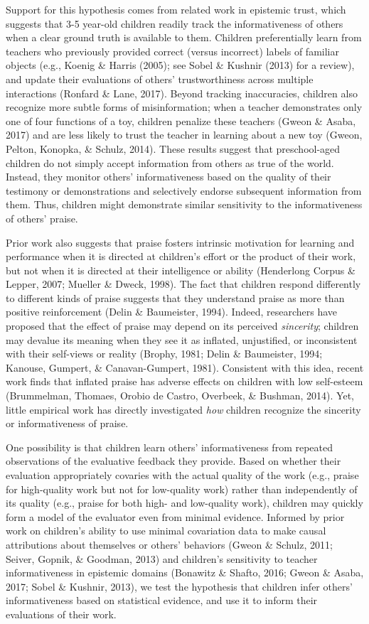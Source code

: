 \documentclass[10pt, letterpaper]{article}
\begin{document}
Support for this hypothesis comes from related work in epistemic trust,
which suggests that 3-5 year-old children readily track the
informativeness of others when a clear ground truth is available to
them. Children preferentially learn from teachers who previously
provided correct (versus incorrect) labels of familiar objects (e.g.,
Koenig \& Harris (2005); see Sobel \& Kushnir (2013) for a review), and
update their evaluations of others' trustworthiness across multiple
interactions (Ronfard \& Lane, 2017). Beyond tracking inaccuracies,
children also recognize more subtle forms of misinformation; when a
teacher demonstrates only one of four functions of a toy, children
penalize these teachers (Gweon \& Asaba, 2017) and are less likely to
trust the teacher in learning about a new toy (Gweon, Pelton, Konopka,
\& Schulz, 2014). These results suggest that preschool-aged children do
not simply accept information from others as true of the world. Instead,
they monitor others' informativeness based on the quality of their
testimony or demonstrations and selectively endorse subsequent
information from them. Thus, children might demonstrate similar
sensitivity to the informativeness of others' praise.

Prior work also suggests that praise fosters intrinsic motivation for
learning and performance when it is directed at children's effort or the
product of their work, but not when it is directed at their intelligence
or ability (Henderlong Corpus \& Lepper, 2007; Mueller \& Dweck, 1998).
The fact that children respond differently to different kinds of praise
suggests that they understand praise as more than positive reinforcement
(Delin \& Baumeister, 1994). Indeed, researchers have proposed that the
effect of praise may depend on its perceived \textit{sincerity};
children may devalue its meaning when they see it as inflated,
unjustified, or inconsistent with their self-views or reality (Brophy,
1981; Delin \& Baumeister, 1994; Kanouse, Gumpert, \& Canavan-Gumpert,
1981). Consistent with this idea, recent work finds that inflated praise
has adverse effects on children with low self-esteem (Brummelman,
Thomaes, Orobio de Castro, Overbeek, \& Bushman, 2014). Yet, little
empirical work has directly investigated \textit{how} children recognize
the sincerity or informativeness of praise.

One possibility is that children learn others' informativeness from
repeated observations of the evaluative feedback they provide. Based on
whether their evaluation appropriately covaries with the actual quality
of the work (e.g., praise for high-quality work but not for low-quality
work) rather than independently of its quality (e.g., praise for both
high- and low-quality work), children may quickly form a model of the
evaluator even from minimal evidence. Informed by prior work on
children's ability to use minimal covariation data to make causal
attributions about themselves or others' behaviors (Gweon \& Schulz,
2011; Seiver, Gopnik, \& Goodman, 2013) and children's sensitivity to
teacher informativeness in epistemic domains (Bonawitz \& Shafto, 2016;
Gweon \& Asaba, 2017; Sobel \& Kushnir, 2013), we test the hypothesis
that children infer others' informativeness based on statistical
evidence, and use it to inform their evaluations of their work.
\end{document}
